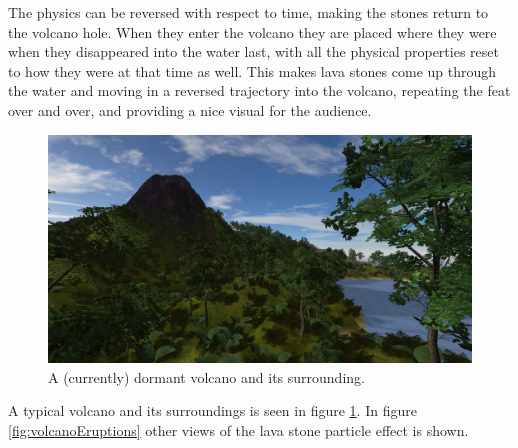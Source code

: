 The physics can be reversed with respect to time, making the stones return to the volcano hole. When they enter the volcano they are placed where they were when they disappeared into the water last, with all the physical properties reset to how they were at that time as well. This makes lava stones come up through the water and moving in a reversed trajectory into the volcano, repeating the feat over and over, and providing a nice visual for the audience.

\begin{figure}[H]
  \centering
  \includegraphics[width=0.9\linewidth]{images/volcano3.jpg}
  \caption{A (currently) dormant volcano and its surrounding.}
  \label{fig:volcano2}
\end{figure}%

A typical volcano and its surroundings is seen in figure \ref{fig:volcano2}. In figure \ref{fig:volcanoEruptions} other views of the lava stone particle effect is shown.

